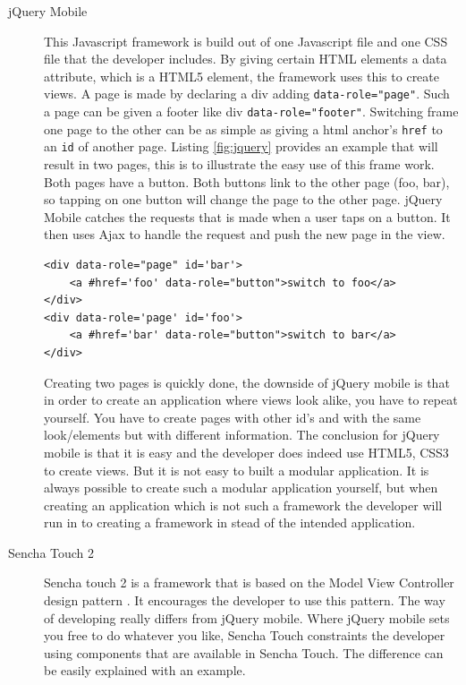 \begin{description}
\item [jQuery Mobile]
This Javascript framework is build out of one Javascript file and one CSS file that the developer includes. By giving certain HTML elements a data attribute, which is a HTML5 element, the framework uses this to create views. A page is made by declaring a div adding \texttt{data-role="page"}. Such a page can be given a footer like div \texttt{data-role="footer"}. 
Switching frame one page to the other can be as simple as giving a html anchor's \texttt{href} to an \texttt{id} of another page. Listing \ref{fig:jquery} provides an example that will result in two pages, this is to illustrate the easy use of this frame work. Both pages have a button. Both buttons link to the other page (foo, bar), so tapping on one button will change the page to the other page. jQuery Mobile catches the requests that is made when a user taps on a button. It then uses Ajax to handle the request and push the new page in the view. 

\begin{lstlisting}[caption={jQuery Mobile, pages example}, label={lst:jquery}]
<div data-role="page" id='bar'>
	<a #href='foo' data-role="button">switch to foo</a>
</div>
<div data-role='page' id='foo'>
	<a #href='bar' data-role="button">switch to bar</a>
</div>
\end{lstlisting}

Creating two pages is quickly done, the downside of jQuery mobile is that in order to create an application where views look alike, you have to repeat yourself. You have to create pages with other id's and with the same look/elements but with different information. The conclusion for jQuery mobile is that it is easy and the developer does indeed use HTML5, CSS3 to create views.  But it is not easy to built a modular application. It is always possible to create such a modular application yourself, but when creating an application which is not such a framework the developer will run in to creating a framework in stead of the intended application.

\item [Sencha Touch 2]
Sencha touch 2 is a framework that is based on the Model View Controller design pattern \cite{MVC}. It encourages the developer to use this pattern. The way of developing really differs from jQuery mobile. Where jQuery mobile sets you free to do whatever you like, Sencha Touch constraints the developer using components that are available in Sencha Touch. The difference can be easily explained with an example.


\end{description}
